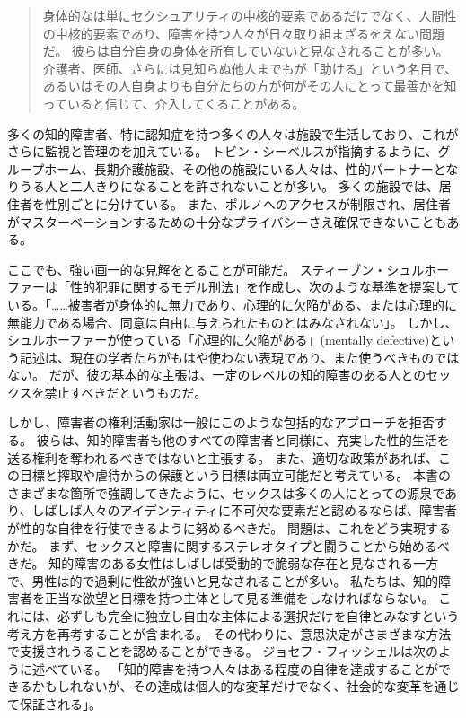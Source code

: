 \documentclass[paper=a4,book,openany]{jlreq} \usepackage{mystyle}
\begin{document}
\begin{quote}
身体的なは単にセクシュアリティの中核的要素であるだけでなく、人間性の中核的要素であり、障害を持つ人々が日々取り組まざるをえない問題だ。
彼らは自分自身の身体を所有していないと見なされることが多い。
介護者、医師、さらには見知らぬ他人までもが「助ける」という名目で、あるいはその人自身よりも自分たちの方が何がその人にとって最善かを知っていると信じて、介入してくることがある。
\citep[p.218]{scott15:_can_disab_peopl_have_sex}
\end{quote}

多くの知的障害者、特に認知症を持つ多くの人々は施設で生活しており、これがさらに監視と管理のを加えている。
トビン・シーベルスが指摘するように、グループホーム、長期介護施設、その他の施設にいる人々は、性的パートナーとなりうる人と二人きりになることを許されないことが多い。
多くの施設では、居住者を性別ごとに分けている。
また、ポルノへのアクセスが制限され、居住者がマスターベーションするための十分なプライバシーさえ確保できないこともある\citep[p.45]{siebers12:_sexual_cultur_disab_peopl}。

ここでも、強い画一的な見解をとることが可能だ。
スティーブン・シュルホーファーは「性的犯罪に関するモデル刑法」を作成し、次のような基準を提案している。「……被害者が身体的に無力であり、心理的に欠陥がある、または心理的に無能力である場合、同意は自由に与えられたものとはみなされない」\citep[p.283]{schulhofer98:_unwan_sex}。
しかし、シュルホーファーが使っている「心理的に欠陥がある」(mentally defective)という記述は、現在の学者たちがもはや使わない表現であり、また使うべきものではない。
だが、彼の基本的な主張は、一定のレベルの知的障害のある人とのセックスを禁止すべきだというものだ。

しかし、障害者の権利活動家は一般にこのような包括的なアプローチを拒否する。
彼らは、知的障害者も他のすべての障害者と同様に、充実した性的生活を送る権利を奪われるべきではないと主張する。
また、適切な政策があれば、この目標と搾取や虐待からの保護という目標は両立可能だと考えている。
本書のさまざまな箇所で強調してきたように、セックスは多くの人にとっての源泉であり、しばしば人々のアイデンティティに不可欠な要素だと認めるならば、障害者が性的な自律を行使できるように努めるべきだ\citep{vehmas19:_person_profoun_intel_disab_their_right_sex,hollomotz10:_vulner_adult,evans09:_sexual_person_relat_peopl_intel_disab,kittay10:_person_is_philos_is_polit}。
問題は、これをどう実現するかだ。
まず、セックスと障害に関するステレオタイプと闘うことから始めるべきだ。
知的障害のある女性はしばしば受動的で脆弱な存在と見なされる一方で、男性は的で過剰に性欲が強いと見なされることが多い\citep{feely16:_sexual_surveil_contr_commun_based,gill15:_alread_doing_it,barrett14:_disab_mascul}。
私たちは、知的障害者を正当な欲望と目標を持つ主体として見る準備をしなければならない。
これには、必ずしも完全に独立し自由な主体による選択だけを自律とみなすという考え方を再考することが含まれる。
その代わりに、意思決定がさまざまな方法で支援されうることを認めることができる。
ジョセフ・フィッシェルは次のように述べている。
「知的障害を持つ人々はある程度の自律を達成することができるかもしれないが、その達成は個人的な変革だけでなく、社会的な変革を通じて保証される」\citep[p.146]{fischel18:screwconsent}。
\end{document}
